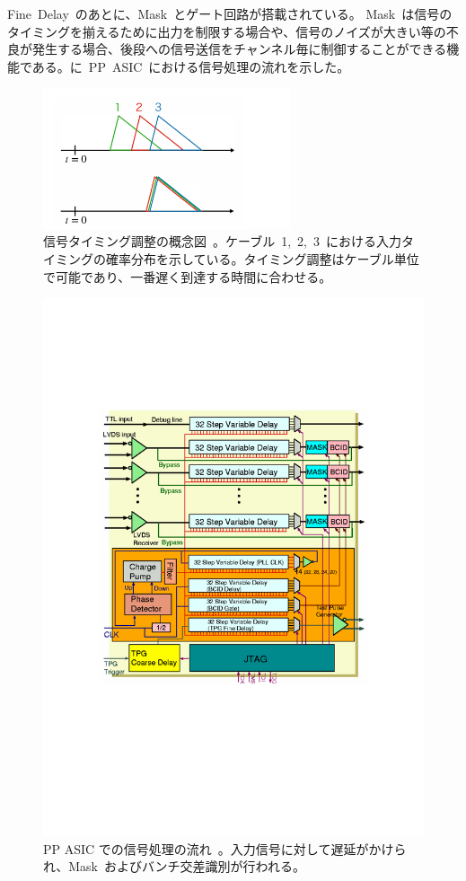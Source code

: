 Fine~Delay~のあとに、Mask~とゲート回路が搭載されている。
Mask~は信号のタイミングを揃えるために出力を制限する場合や、信号のノイズが大きい等の不良が発生する場合、後段への信号送信をチャンネル毎に制御することができる機能である。に~PP~ASIC~における信号処理の流れを示した。
\begin{figure}[H]
        \centering   
        \includegraphics[width=0.65\textwidth,page=1]{img/slide/slide.pdf}
        \caption[信号タイミング調整の概念図]{信号タイミング調整の概念図~\cite{URL:09}。ケーブル~1,~2,~3~における入力タイミングの確率分布を示している。タイミング調整はケーブル単位で可能であり、一番遅く到達する時間に合わせる。}
        \label{fig:delay}
\end{figure}

\begin{figure}[H]
        \centering   
        \includegraphics[width=\textwidth,page=1]{img/pdf/PP.pdf}
        \caption[PP ASIC での信号処理の流れ]
        {PP ASIC での信号処理の流れ~\cite{URL:05}。入力信号に対して遅延がかけられ、Mask~およびバンチ交差識別が行われる。}
        \label{fig:PP}
\end{figure}

